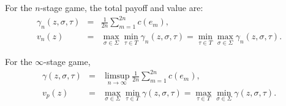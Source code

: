 \documentclass[11pt, mathserif]{beamer}
\begin{document}
    \begin{frame}
        For the $n$-stage game, the total payoff and value are:
        \begin{eqnarray*}
          \gamma_n(z, \sigma, \tau) & = & \frac{1}{2n}\sum_{m = 1}^{2n}c(e_m), \\
                            v_n(z)  & = & \max_{\sigma \in \Sigma}\min_{\tau \in T} \gamma_n(z, \sigma, \tau) = \min_{\tau \in T}\max_{\sigma \in \Sigma} \gamma_n(z, \sigma, \tau).
        \end{eqnarray*}
        \pause

        For the $\infty$-stage game,
        \begin{eqnarray*}      
          \gamma(z, \sigma, \tau) & = & \limsup_{n \to \infty}\frac{1}{2n}\sum_{m = 1}^{2n}c(e_m), \\
                           v_p(z) & = & \max_{\sigma \in \Sigma}\min_{\tau \in T} \gamma(z, \sigma, \tau) = \max_{\tau \in T}\min_{\sigma \in \Sigma} \gamma(z, \sigma, \tau).
        \end{eqnarray*}
    \end{frame} 


\end{document}
